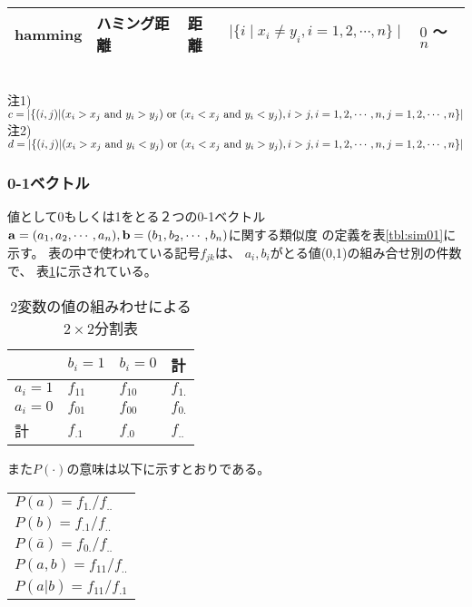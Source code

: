 \begin{table}[htbp]
\begin{center}
{\begin{tabular}{lllll}
hamming   & ハミング距離   & 距離 & 
$
\mid\{i \mid x_i\ne y_i, i=1,2,\cdots,n\}\mid
$
 & $0$ 〜 $n$\\

\hline
\end{tabular}
}
{\footnotesize
\\
注1)
$c=|\{(i,j)|(x_i>x_j ~{\rm and}~ y_i>y_j) ~{\rm or}~ (x_i<x_j ~{\rm and}~ y_i<y_j), i>j, i=1,2,\cdots,n, j=1,2,\cdots,n\}|$\\
注2)
$d=|\{(i,j)|(x_i>x_j ~{\rm and}~ y_i<y_j) ~{\rm or}~ (x_i<x_j ~{\rm and}~ y_i>y_j), i>j, i=1,2,\cdots,n, j=1,2,\cdots,n\}|$
}

\end{center}
\end{table}

\subsubsection*{0-1ベクトル}
値として0もしくは1をとる２つの0-1ベクトル${\bf a}=(a_1,a_2,\cdots,a_n),{\bf b}=(b_1,b_2,\cdots,b_n)$に関する類似度
の定義を表\ref{tbl:sim01}に示す。
表の中で使われている記号$f_{jk}$は、
$a_i,b_i$がとる値(0,1)の組み合せ別の件数で、
表\ref{tbl:matrix}に示されている。

\begin{table}[htbp]
\begin{center}
\caption{2変数の値の組みわせによる$2\times 2$分割表\label{tbl:matrix}}
{\small 
\begin{tabular}{l|ll|l}
\hline
 & $b_i=1$ & $b_i=0$ & 計\\
\hline
$a_i=1$ & $f_{11}$ & $f_{10}$ & $f_{1.}$\\
$a_i=0$ & $f_{01}$ & $f_{00}$ & $f_{0.}$\\
\hline
計 & $f_{.1}$ & $f_{.0}$ & $f_{..}$\\
\hline
\end{tabular}
}
\end{center}
\end{table}

また$P(\cdot)$の意味は以下に示すとおりである。
\begin{table}[htbp]
\begin{center}
{\small 
\begin{tabular}{l}
\hline
$P(a)=f_{1.}/f_{..}$\\
$P(b)=f_{.1}/f_{..}$\\
$P({\bar a})=f_{0.}/f_{..}$\\
$P(a,b)=f_{11}/f_{..}$\\
$P(a|b)=f_{11}/f_{.1}$\\
\hline
\end{tabular}
}
\end{center}
\end{table}


